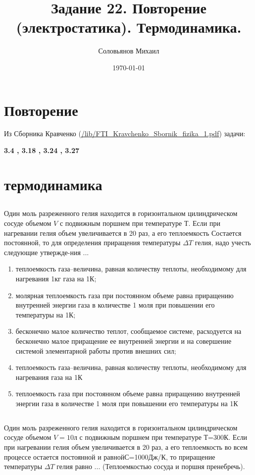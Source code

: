 \documentclass[a4paper,12pt]{article} %
\author{Соловьянов Михаил }
\title{Задание 22. Повторение (электростатика).  Термодинамика.}
\date{\today}
\begin{document}
\maketitle

\section{Повторение}

Из Сборника Кравченко (\url{/lib/FTI_Kravchenko_Sbornik_fizika_1.pdf}) задачи:

\textbf{3.4 , 3.18 , 3.24 ,   3.27}


\section{термодинамика}

\subsection{}

Один моль разреженного гелия находится в горизонтальном цилиндрическом сосуде объемом $V$ с подвижным поршнем при температуре $Т$. Если при нагревании гелия объем увеличивается в 20 раз, а его теплоемкость Состается постоянной, то для определения приращения температуры $ \Delta T$ гелия, надо учесть следующие утвержде-ния ... 

\begin{enumerate}

\item теплоемкость  газа–величина,  равная  количеству  теплоты, необходимому для нагревания 1кг газа на 1К;
\item молярная  теплоемкость  газа  при  постоянном  объеме  равна приращению  внутренней  энергии  газа  в  количестве  1  моля  при повышении его температуры на 1К;
\item бесконечно  малое  количество  теплот,  сообщаемое  системе, расходуется  на  бесконечно  малое  приращение  ее  внутренней энергии и на совершение системой элементарной работы против внешних сил;
\item теплоемкость  газа–величина,  равная  количеству  теплоты, необходимому для нагревания газа на 1К
\item теплоемкость  газа  при  постоянном  объеме  равна  приращению внутренней энергии газа в количестве 1 моля при повышении его температуры на 1К

\end{enumerate}

\subsection{}
Один моль разреженного гелия находится в горизонтальном  цилиндрическом  сосуде  объемом $V = 10 $л  с  подвижным поршнем при температуре Т=300К. Если при нагревании гелия объем увеличивается в 20 раз, а его теплоемкость во всем процессе остается постоянной  и  равнойС=1000Дж/К,  то  приращение  температуры $ \Delta T$  гелия равно ... (Теплоемкостью сосуда и поршня пренебречь).
\end{document}
